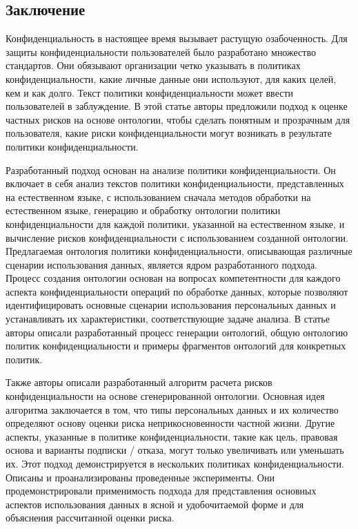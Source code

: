 \documentclass[../main]{subfiles}
\begin{document}
\subsection{Заключение}
Конфиденциальность в настоящее время вызывает растущую озабоченность. Для защиты конфиденциальности пользователей было разработано множество стандартов. Они обязывают организации четко указывать в политиках конфиденциальности, какие личные данные они используют, для каких целей, кем и как долго. Текст политики конфиденциальности может ввести пользователей в заблуждение. В этой статье авторы предложили подход к оценке частных рисков на основе онтологии, чтобы сделать понятным и прозрачным для пользователя, какие риски конфиденциальности могут возникать в результате политики конфиденциальности.

Разработанный подход основан на анализе политики конфиденциальности. Он включает в себя анализ текстов политики конфиденциальности, представленных на естественном языке, с использованием сначала методов обработки на естественном языке, генерацию и обработку онтологии политики конфиденциальности для каждой политики, указанной на естественном языке, и вычисление рисков конфиденциальности с использованием созданной онтологии. Предлагаемая онтология политики конфиденциальности, описывающая различные сценарии использования данных, является ядром разработанного подхода. Процесс создания онтологии основан на вопросах компетентности для каждого аспекта конфиденциальности операций по обработке данных, которые позволяют идентифицировать основные сценарии использования персональных данных и устанавливать их характеристики, соответствующие задаче анализа. В статье авторы описали разработанный процесс генерации онтологий, общую онтологию политик конфиденциальности и примеры фрагментов онтологий для конкретных политик.

Также авторы описали разработанный алгоритм расчета рисков конфиденциальности на основе сгенерированной онтологии. Основная идея алгоритма заключается в том, что типы персональных данных и их количество определяют основу оценки риска неприкосновенности частной жизни. Другие аспекты, указанные в политике конфиденциальности, такие как цель, правовая основа и варианты подписки / отказа, могут только увеличивать или уменьшать их.
Этот подход демонстрируется в нескольких политиках конфиденциальности. Описаны и проанализированы проведенные эксперименты. Они продемонстрировали применимость подхода для представления основных аспектов использования данных в ясной и удобочитаемой форме и для объяснения рассчитанной оценки риска.
\end{document}
